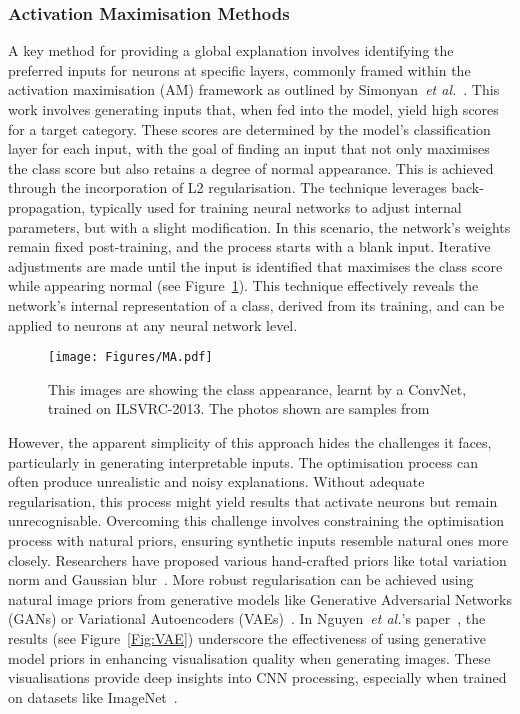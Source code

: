 \subsubsection{Activation Maximisation Methods}

A key method for providing a global explanation involves identifying the preferred inputs for neurons at specific layers, commonly framed within the activation maximisation (AM) framework as outlined by Simonyan~\textit{et al.}~\cite{SimonyanVZ13}. This work involves generating inputs that, when fed into the model, yield high scores for a target category. These scores are determined by the model’s classification layer for each input, with the goal of finding an input that not only maximises the class score but also retains a degree of normal appearance. This is achieved through the incorporation of L2 regularisation. The technique leverages back-propagation, typically used for training neural networks to adjust internal parameters, but with a slight modification. In this scenario, the network's weights remain fixed post-training, and the process starts with a blank input. Iterative adjustments are made until the input is identified that maximises the class score while appearing normal (see Figure~\ref{Fig:AM}). This technique effectively reveals the network's internal representation of a class, derived from its training, and can be applied to neurons at any neural network level.

\begin{figure}[ht!]
	\begin{center}
		\texttt{[image: Figures/MA.pdf]}
	\end{center}
	\caption{This images are showing the class appearance, learnt by a ConvNet, trained on ILSVRC-2013. The photos shown are samples from~\cite{SimonyanVZ13}}
	\label{Fig:AM}
\end{figure} 

However, the apparent simplicity of this approach hides the challenges it faces, particularly in generating interpretable inputs. The optimisation process can often produce unrealistic and noisy explanations. Without adequate regularisation, this process might yield results that activate neurons but remain unrecognisable. Overcoming this challenge involves constraining the optimisation process with natural priors, ensuring synthetic inputs resemble natural ones more closely. Researchers have proposed various hand-crafted priors like total variation norm and Gaussian blur~\cite{NguyenDYBC16}. More robust regularisation can be achieved using natural image priors from generative models like Generative Adversarial Networks (GANs) or Variational Autoencoders (VAEs)~\cite{NguyenDYBC16}. In Nguyen~\textit{et al.}'s paper~\cite{NguyenDYBC16}, the results (see Figure~\ref{Fig:VAE}) underscore the effectiveness of using generative model priors in enhancing visualisation quality when generating images. These visualisations provide deep insights into CNN processing, especially when trained on datasets like ImageNet~\cite{deng2009imagenet}.

